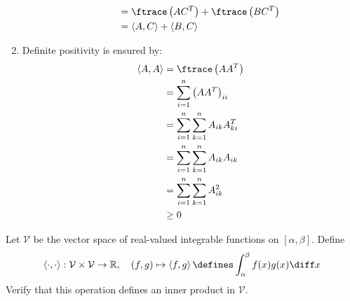 \begin{exm}
\begin{flushleft}
\begin{enumerate}
\begin{enumerate}
\begin{align*}
					                               & = \ftrace\left(AC^T\right) + \ftrace\left(BC^T\right) \\
					                               & = \left<A,C\right>+\left<B,C\right>
				            \end{align*}
			      \end{enumerate}
			\item Definite positivity is ensured by:
			      \begin{align*}
				      \left<A,A\right> & = \ftrace\left(AA^T\right)                  \\
				                       & = \sum_{i=1}^n\left(AA^T\right)_{ii}        \\
				                       & = \sum_{i=1}^n \sum_{k=1}^n A_{ik} A_{ki}^T \\
				                       & = \sum_{i=1}^n \sum_{k=1}^n A_{ik} A_{ik}   \\
				                       & =\sum_{i=1}^n \sum_{k=1}^n A_{ik}^2         \\
				                       & \geq0
			      \end{align*}
		\end{enumerate}
	\end{flushleft}
\end{exm}

\begin{exm}\label{exm-inner-product:4}
	Let $\mathcal{V}$ be the vector space of real-valued integrable functions on
	$[\alpha,\beta]$. Define
	\begin{equation}
		\left<\cdot,\cdot\right>:\mathcal{V}\times\mathcal{V}\to\mathbb{R},
		\quad(f,g)\mapsto\left<f,g\right>\defines\int_\alpha^\beta f(x)g(x)\diff x
	\end{equation}
	Verify that this operation defines an inner product in $\mathcal{V}$.
\end{exm}
